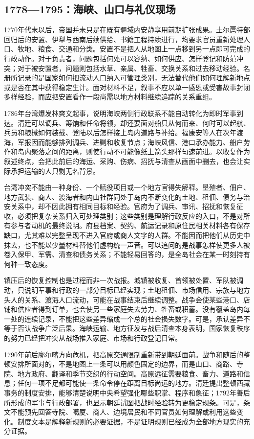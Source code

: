 \subsection{1778—1795：海峡、山口与礼仪现场}

1770年代末以后，帝国并未只是在既有疆域内安静享用前期扩张成果。土尔扈特部回归后的安置、伊犁与西南后续供给、书籍工程持续进行，均要求官员重新处理人口、牧地、粮食、交通和分类。安置不是把人从地图上一点移到另一点即可完成的行政动作。对于负责者，问题包括何处可以容纳、如何供应、怎样登记和防范冲突；对于被安置者，问题则包括水草、亲属、牲畜、交换关系和过去移动经验。名册所记录的是国家如何把流动人口纳入可管理类别，无法替代他们如何理解新地点或是否在其中获得稳定生计。面对材料不足，叙事不应以单一感恩或受害故事封闭多样经验，而应把安置看作一段尚需以地方材料继续追踪的关系重组。

1786年台湾爆发林爽文起事，说明海峡两侧行政联系不能自动转化为即时军事到达。清廷可以调兵、筹饷和任命将领，却还要面对船只从何而来、何时可以起航、兵员和粮械如何装载、登陆以后怎样接上岛内道路与补给。福康安等人在次年渡海，军报因而能够排列调兵、进剿和收复节点；海峡风信、港口承办能力、船户劳作和岛内聚落之间的距离，则使行动不可能像纸上箭头那样匀速前进。以收复作为叙述终点，会把此前后的海运、采购、伤病、招抚与清查从画面中删去，也会让实际承担运输的人只剩无名背景。

台湾冲突不能由一种身份、一个赋役项目或一个地方官得失解释。垦殖者、佃户、地方武装、商人、渡海者和内山社群同处于岛内不断变化的土地、租佃、债务与治安关系中，却不因此拥有相同目标和经验。官府为了调兵、审讯、招抚和恢复征收，必须把复杂关系归入可处理类别；这些类别是理解行政反应的入口，不是对所有参与者动机的最终说明。府县档案、契约、航运记录和原住民相关材料各有保存缺口，尤其难以完整呈现不进入官府或商人文字的人群。不能因而把他们从历史中抹去，也不能以少量材料替他们虚构统一声音。可以追问的是战事怎样使更多人被卷入保甲、军需、清查和债务关系；不能轻易回答的，是全岛社会在某一时刻持有何种一致态度。

镇压后的恢复控制也是过程而非一次战报。城镇被收复、首领被处置、军队被调动，只说明军事和行政的一部分目标已经实现；土地租佃、市场信用、宗族与地方头人的关系、渡海人口流动，可能在战事结束后继续调整。战争会使某些港口、店铺和供应者得到订单，也会使另一些家庭失去劳力、牲畜或积蓄。没有覆盖岛内每一处的连续记录，不能把这些差异缩成一个总的社会损失数字。可是，承认差异不等于否认战争广泛后果。海峡运输、地方征发与战后清查本身表明，国家恢复秩序的努力已经把冲突从战场推入家庭、市场和行政登记日常。

1790年前后廓尔喀方向危机，把高原交通限制重新带到朝廷面前。战争和随后的整顿安排所面对的，不是地图上一条可以用颜色固定的边界，而是山口、商路、寺院、地方政府、翻译和季节交织的行动空间。高原远征需要粮食、畜力、道路和信息；任何一项不足都可能使一条命令停在距离目标尚远的地方。清廷提出整顿西藏事务的制度安排，能够清楚说明中央希望强化哪些职掌、程序和象征；1792年善后所形成的军事与行政部署，也显示朝廷试图把战时经验转为更稳定规条。可是，条文不能预先回答寺院、噶厦、商人、边境居民和不同官员如何理解或利用这些变化。制度文本是解释新规则的必要证据，不是证明规则已经成为全部地方现实的充分证据。

